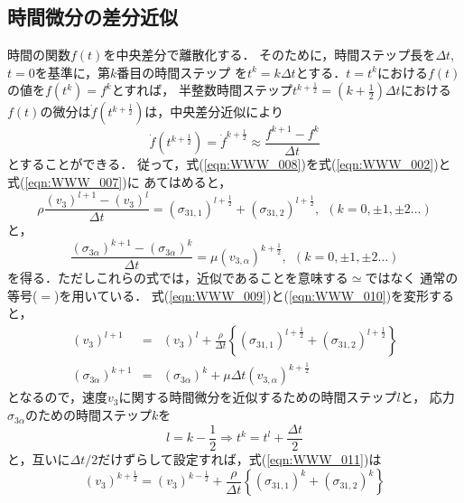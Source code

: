\subsection{時間微分の差分近似}
時間の関数$f(t)$を中央差分で離散化する．
そのために，時間ステップ長を$\Delta t$, $t=0$を基準に，第$k$番目の時間ステップ
を$t^k=k\Delta t$とする．$t=t^k$における$f(t)$の値を$f(t^{k})=f^k$とすれば，
半整数時間ステップ$t^{k+\frac{1}{2}}=(k+\frac{1}{2})\Delta t$における
$f(t)$の微分は$\dot f(t^{k+\frac{1}{2}})$は，中央差分近似により
\begin{equation}
	\dot{f}(t^{k+\frac{1}{2}})
	=\dot{f}^{k+\frac{1}{2}} \approx \frac{ f^{k+1}-f^k}{\Delta t}
	\label{eqn:WWW_008}
\end{equation}
とすることができる．
従って，式(\ref{eqn:WWW_008})を式(\ref{eqn:WWW_002})と式(\ref{eqn:WWW_007})に
あてはめると，
\begin{equation}
	\rho \frac{ (v_3)^{l+1}-(v_3)^l}{\Delta t}
	=
	(\sigma_{31,1})^{l+\frac{1}{2}}
	+
	(\sigma_{31,2})^{l+\frac{1}{2}}, 
	\ \ (k=0,\pm 1, \pm 2\dots )
	\label{eqn:WWW_009}
\end{equation}
と，
\begin{equation}
	\frac{ (\sigma_{3\alpha})^{k+1}-(\sigma_{3\alpha})^k}{\Delta t}
	=
	\mu (v_{3,\alpha})^{k+\frac{1}{2}},
	\ \ (k=0,\pm 1, \pm 2\dots )
	\label{eqn:WWW_010}
\end{equation}
を得る．ただしこれらの式では，近似であることを意味する$\simeq$ではなく
通常の等号($=$)を用いている．
式(\ref{eqn:WWW_009})と(\ref{eqn:WWW_010})を変形すると，
\begin{eqnarray}
	(v_3)^{l+1} &=& 
	(v_3)^l
	+
	\frac{\rho}{\Delta t} \left\{
	(\sigma_{31,1})^{l+\frac{1}{2}} + (\sigma_{31,2})^{l+\frac{1}{2}}
	\right\} 
	\label{eqn:WWW_011}\\
	(\sigma_{3\alpha})^{k+1} &=& 
	(\sigma_{3\alpha})^{k} 
	+
	\mu \Delta t (v_{3,\alpha})^{k+\frac{1}{2}}
	\label{eqn:WWW_012}
\end{eqnarray}
となるので，速度$v_3$に関する時間微分を近似するための時間ステップ$l$と，
応力$\sigma_{3\alpha}$のための時間ステップ$k$を
\begin{equation}
	l=k-\frac{1}{2} \Rightarrow t^k=t^l+\frac{\Delta t}{2}
	\label{eqn:WWW_013}
\end{equation}
と，互いに$\Delta t/2$だけずらして設定すれば，式(\ref{eqn:WWW_011})は
\begin{equation}
	(v_3)^{k+\frac{1}{2}} = (v_3)^{k-\frac{1}{2}}
	+
	\frac{\rho}{\Delta t} \left\{
	(\sigma_{31,1})^{k} + (\sigma_{31,2})^{k}
	\right\} 
	\label{eqn:WWW_014}
\end{equation}
